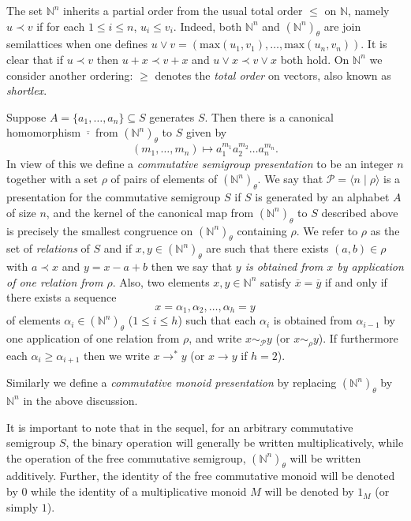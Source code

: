 \documentclass{acmconf}
\def\N{{\mathbb{N}}}
\def\max{{\mbox{max}}}
\begin{document}
The set $\N^n$ inherits a partial order from the
usual total order $\leq$ on $\mathbb{N}$, namely
$u \prec v$ if for each $1 \leq i \leq n$, $u_i \leq v_i$.
Indeed, both $\N^n$ and $(\N^n)_\theta$ are join semilattices when
one defines $u \vee v = (\max(u_1, v_1), \ldots, \max(u_n,v_n))$.
It is clear that if $u \prec v$ then $u + x \prec v + x$ and
$u \vee x \prec v \vee x$ both hold.
On $\mathbb{N}^n$ we consider another ordering: $\geq$ denotes
the \emph{total order} on vectors, also known as \emph{shortlex}. 

Suppose $A = \{a_1, \ldots, a_n\} \subseteq S$ generates 
$S$. Then there is a canonical homomorphism $\overline{\cdot}$
from $(\N^n)_\theta$ to $S$ given by 
$$(m_1, \ldots, m_n) \mapsto a_1^{m_1} a_2^{m_2} \ldots a_n^{m_n}.$$
In view of this we define a {\em commutative semigroup presentation} to
be an integer $n$ together with a set $\rho$ of pairs of elements 
of $(\N^n)_\theta$. We say that $\mathcal{P}=\langle n  \mid \rho \rangle$
is a presentation for the commutative semigroup $S$ if $S$ is generated
by an alphabet  $A$ of size $n$, and the kernel of the canonical map
from $(\N^n)_\theta$ to $S$ described above is precisely the smallest
congruence on $(\N^n)_\theta$ containing $\rho$.
We refer to $\rho$ as the set of \emph{relations} of $S$ and if
$x,y\in (\mathbb{N}^n)_{\theta}$ are such that there exists $(a,b)\in \rho$
with $a \prec x$ and  $y=x-a+b$ then we say that \emph{$y$ is obtained
from $x$ by application of one relation from $\rho$}.
Also, two elements $x,y\in\mathbb{N}^n$ satisfy $\overline{x}=
\overline{y}$ if and only if there exists a sequence 
$$x=\alpha_1,\alpha_2,\ldots,\alpha_h=y$$
of elements $\alpha_i\in(\mathbb{N}^n)_{\theta}$ ($1\leq i\leq h$)
such that each $\alpha_i$ is obtained from $\alpha_{i-1}$ by
one application of one relation from $\rho$,
and write $x\sim_{\mathcal{P}}y$ (or $x\sim_{\rho}y$).
If furthermore each $\alpha_{i}\geq\alpha_{i+1}$  
then we write $x\rightarrow^*y$ (or $x\rightarrow y$ if $h=2$).

Similarly we define a \emph{commutative monoid presentation}
by replacing $(\mathbb{N}^n)_{\theta}$ by $\mathbb{N}^n$ in
the above discussion. 

It is important to note that in the sequel, for an arbitrary commutative semigroup
$S$,
the binary operation will generally be written multiplicatively, while
the operation of the free commutative semigroup, $(\mathbb{N}^n)_\theta$ 
will be written additively.
Further, the identity of the free commutative monoid will be denoted by $0$
while the identity of a multiplicative monoid $M$ will be denoted by $1_M$ (or
simply $1$).
\end{document}
